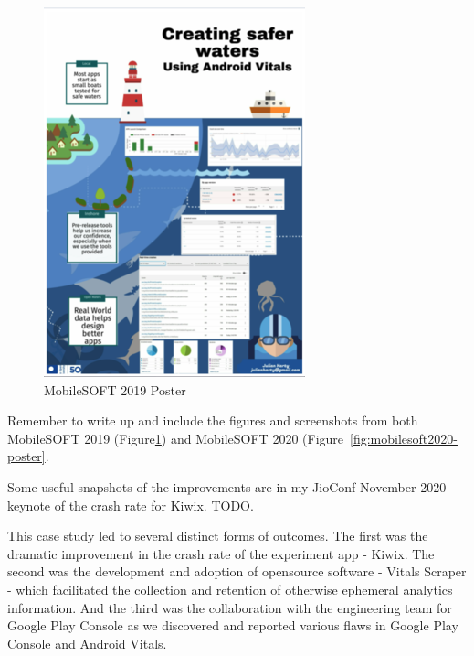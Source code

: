 \begin{figure}
    \centering
    \includegraphics{images/mobilesoft/resized-mobilesoft2019-poster.png}
    \caption{MobileSOFT 2019 Poster}
    \label{fig:mobilesoft2019-poster}
\end{figure}

Remember to write up and include the figures and screenshots from both MobileSOFT 2019 (Figure\ref{fig:mobilesoft2019-poster}) and MobileSOFT 2020 (Figure~\ref{fig:mobilesoft2020-poster}.

Some useful snapshots of the improvements are in my JioConf November 2020 keynote of the crash rate for Kiwix. TODO.


This case study led to several distinct forms of outcomes. The first was the dramatic improvement in the crash rate of the experiment app - Kiwix. The second was the development and adoption of opensource software - Vitals Scraper - which facilitated the collection and retention of otherwise ephemeral analytics information. And the third was the collaboration with the engineering team for Google Play Console as we discovered and reported various flaws in Google Play Console and Android Vitals. 

